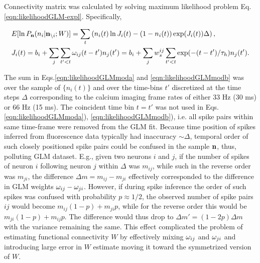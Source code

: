 Connectivity matrix was calculated by solving maximum likelihood problem Eq. \eqref{eqn:likelihoodGLM-expl}. Specifically, 

\begin{align}
\label{eqn:likelihoodGLMmoda}&E[\ln P_{{\bf n}}(n_i|{\bf n}_{\backslash i}; W)]=\sum_t \left( n_i(t) \ln J_i(t) - (1-n_i(t)) \exp(J_i(t)) \Delta \right), \\
\label{eqn:likelihoodGLMmodb}&J_i(t)=b_i+\sum\limits_j \sum\limits_{t'<t} \omega_{ij}(t-t')n_{j}(t')=
b_i+\sum\limits_j w^{ij}_s \sum\limits_{t'<t} \exp(-(t-t')/\tau_h)n_j(t').
\end{align}

The sum in Eqs.\eqref{eqn:likelihoodGLMmoda} and \eqref{eqn:likelihoodGLMmodb} was over the sample of $\{n_i(t)\}$ and over the time-bins $t'$ discretized at the time steps $\Delta$ corresponding to the calcium imaging frame rates of either 33 Hz (30 ms) or 66 Hz (15 ms). The coincident time bin $t=t'$ was not used in Eqs.\eqref{eqn:likelihoodGLMmoda}), \eqref{eqn:likelihoodGLMmodb}), i.e.  all spike pairs within same time-frame were removed from the GLM fit.  Because time position of spikes inferred from fluorescence data typically had inaccuracy $\sim \Delta$, temporal order of such closely positioned spike pairs could be confused in the sample ${\bf n}$, thus, polluting GLM dataset.  E.g., given two neurons $i$ and $j$, if the number of spikes of neuron $i$ following neuron $j$ within $\Delta$ was $m_{ij}$, while such in the reverse order was $m_{ji}$, the difference $\Delta m = m_{ij}-m_{ji}$ effectively corresponded to the difference in GLM weights $\omega_{ij}-\omega_{ji}$. However, if during spike inference the order of such spikes was confused with probability $p\approx 1/2$, the observed number of spike pairs $ij$ would become $m_{ij}(1-p)+m_{ji}p$, while for the reverse order this would be $m_{ji}(1-p)+m_{ij}p$. The difference would thus drop to $\Delta m '= (1-2p)\Delta m$ with the variance remaining the same. This effect complicated the problem of estimating functional connectivity $W$ by effectively mixing $\omega_{ij}$ and $\omega_{ji}$ and introducing large error in $W$ estimate moving it toward the symmetrized version of $W$.

